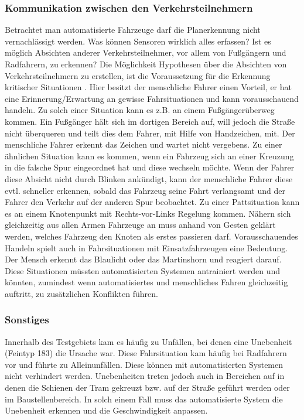 \subsubsection{Kommunikation zwischen den Verkehrsteilnehmern}
Betrachtet man automatisierte Fahrzeuge darf die Planerkennung nicht vernachlässigt werden. Was können Sensoren wirklich alles erfassen? Ist es möglich Absichten anderer Verkehrsteilnehmer, vor allem von Fußgängern und Radfahrern, zu erkennen? Die Möglichkeit Hypothesen über die Absichten von Verkehrsteilnehmern zu erstellen, ist die Voraussetzung für die Erkennung kritischer Situationen \parencite[S. 30]{MockHecker.1994}. Hier besitzt der menschliche Fahrer einen Vorteil, er hat eine Erinnerung/Erwartung an gewisse Fahrsituationen und kann vorausschauend handeln. Zu solch einer Situation kann es z.B. an einem Fußgängerüberweg kommen. Ein Fußgänger hält sich im dortigen Bereich auf, will jedoch die Straße nicht überqueren und teilt dies dem Fahrer, mit Hilfe von Handzeichen, mit. Der menschliche Fahrer erkennt das Zeichen und wartet nicht vergebens. Zu einer ähnlichen Situation kann es kommen, wenn ein Fahrzeug sich an einer Kreuzung in die falsche Spur eingeordnet hat und diese wechseln möchte. Wenn der Fahrer diese Absicht nicht durch Blinken ankündigt, kann der menschliche Fahrer diese evtl. schneller erkennen, sobald das Fahrzeug seine Fahrt verlangsamt und der Fahrer den Verkehr auf der anderen Spur beobachtet. Zu einer Pattsituation kann es an einem Knotenpunkt mit Rechts-vor-Links Regelung kommen. Nähern sich gleichzeitig aus allen Armen Fahrzeuge an muss anhand von Gesten geklärt werden, welches Fahrzeug den Knoten als erstes passieren darf. Vorausschauendes Handeln spielt auch in Fahrsituationen mit Einsatzfahrzeugen eine Bedeutung. Der Mensch erkennt das Blaulicht oder das Martinshorn und reagiert darauf. Diese Situationen müssten automatisierten Systemen antrainiert werden und könnten, zumindest wenn automatisiertes und menschliches Fahren gleichzeitig auftritt, zu zusätzlichen Konflikten führen.

\subsubsection{Sonstiges}
Innerhalb des Testgebiets kam es häufig zu Unfällen, bei denen eine Unebenheit (Feintyp 183) die Ursache war. Diese Fahrsituation kam häufig bei Radfahrern vor und führte zu Alleinunfällen. Diese können mit automatisierten Systemen nicht verhindert werden. Unebenheiten treten jedoch auch in Bereichen auf in denen die Schienen der Tram gekreuzt bzw. auf der Straße geführt werden oder im Baustellenbereich. In solch einem Fall muss das automatisierte System die Unebenheit erkennen und die Geschwindigkeit anpassen.

